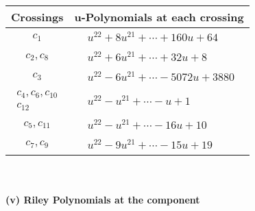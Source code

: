\documentclass[1p]{elsarticle_modified}
\theoremstyle{definition}
\begin{document}
\begin{tabular}{m{50pt}|m{274pt}}
Crossings & \hspace{64pt}u-Polynomials at each crossing \\
\hline $$\begin{aligned}c_{1}\end{aligned}$$&$\begin{aligned}
&u^{22}+8 u^{21}+\cdots+160 u+64
\end{aligned}$\\
\hline $$\begin{aligned}c_{2},c_{8}\end{aligned}$$&$\begin{aligned}
&u^{22}+6 u^{21}+\cdots+32 u+8
\end{aligned}$\\
\hline $$\begin{aligned}c_{3}\end{aligned}$$&$\begin{aligned}
&u^{22}-6 u^{21}+\cdots-5072 u+3880
\end{aligned}$\\
\hline $$\begin{aligned}c_{4},c_{6},c_{10}\\c_{12}\end{aligned}$$&$\begin{aligned}
&u^{22}- u^{21}+\cdots- u+1
\end{aligned}$\\
\hline $$\begin{aligned}c_{5},c_{11}\end{aligned}$$&$\begin{aligned}
&u^{22}- u^{21}+\cdots-16 u+10
\end{aligned}$\\
\hline $$\begin{aligned}c_{7},c_{9}\end{aligned}$$&$\begin{aligned}
&u^{22}-9 u^{21}+\cdots-15 u+19
\end{aligned}$\\
\hline
\end{tabular}\\~\\
\newpage\renewcommand{\arraystretch}{1}
\flushleft \textbf{(v) Riley Polynomials at the component}\newline \\
\end{document}
